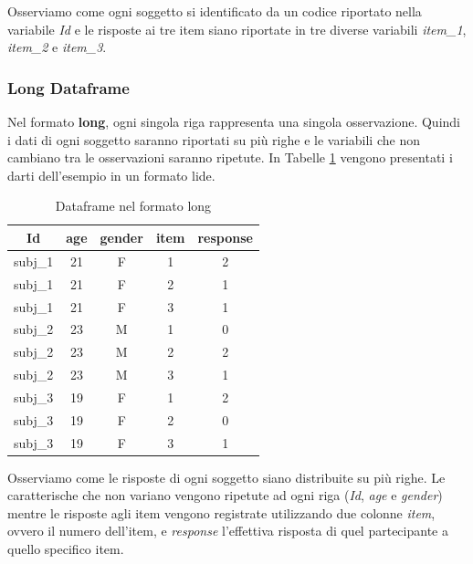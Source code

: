 \documentclass[
]{book}
\begin{document}
Osserviamo come ogni soggetto si identificato da un codice riportato nella variabile \emph{Id} e le risposte ai tre item siano riportate in tre diverse variabili \emph{item\_1}, \emph{item\_2} e \emph{item\_3}.

\hypertarget{long-dataframe}{%
\subsubsection*{Long Dataframe}\label{long-dataframe}}

Nel formato \textbf{long}, ogni singola riga rappresenta una singola osservazione. Quindi i dati di ogni soggetto saranno riportati su più righe e le variabili che non cambiano tra le osservazioni saranno ripetute. In Tabelle \ref{tab:table-long-db} vengono presentati i darti dell'esempio in un formato lide.

\begin{table}

\caption{\label{tab:table-long-db}Dataframe nel formato long}
\centering
\begin{tabular}[t]{c|c|c|c|c}
\hline
Id & age & gender & item & response\\
\hline
subj\_1 & 21 & F & 1 & 2\\
\hline
subj\_1 & 21 & F & 2 & 1\\
\hline
subj\_1 & 21 & F & 3 & 1\\
\hline
subj\_2 & 23 & M & 1 & 0\\
\hline
subj\_2 & 23 & M & 2 & 2\\
\hline
subj\_2 & 23 & M & 3 & 1\\
\hline
subj\_3 & 19 & F & 1 & 2\\
\hline
subj\_3 & 19 & F & 2 & 0\\
\hline
subj\_3 & 19 & F & 3 & 1\\
\hline
\end{tabular}
\end{table}

Osserviamo come le risposte di ogni soggetto siano distribuite su più righe. Le caratterische che non variano vengono ripetute ad ogni riga (\emph{Id}, \emph{age} e \emph{gender}) mentre le risposte agli item vengono registrate utilizzando due colonne \emph{item}, ovvero il numero dell'item, e \emph{response} l'effettiva risposta di quel partecipante a quello specifico item.
\end{document}
